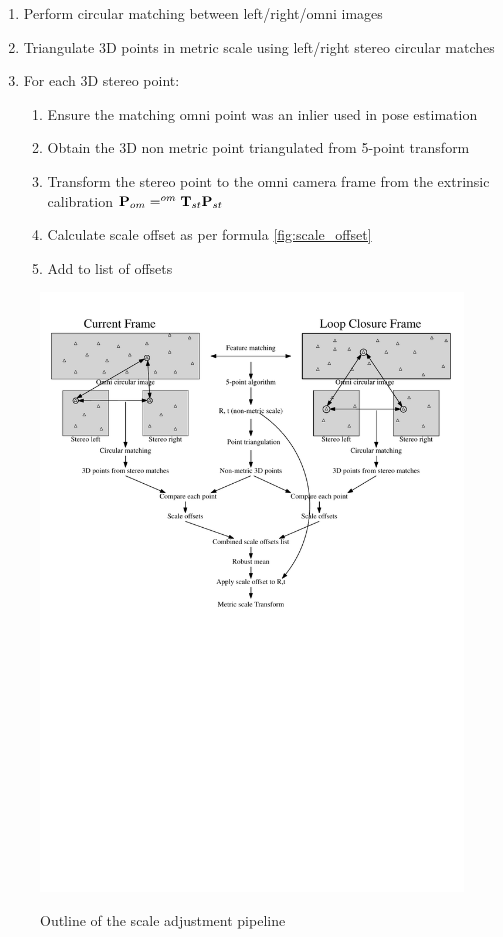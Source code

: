 \begin{enumerate}
\itemsep0em
 \item Perform circular matching between left/right/omni images %
 \item Triangulate 3D points in metric scale using left/right stereo circular matches
 \item For each 3D stereo point:
 \begin{enumerate}
   \item Ensure the matching omni point was an inlier used in pose estimation
   \item Obtain the 3D non metric point triangulated from 5-point transform
   \item Transform the stereo point to the omni camera frame from the extrinsic calibration $\mathbf P_{om} =  ^{om}\mathbf T_{st} \mathbf P_{st}$
   \item Calculate scale offset as per formula \ref{fig:scale_offset} %
   \item Add to list of offsets 
 \end{enumerate}
\end{enumerate} 

\begin{figure}[h]
  \centering
    \includegraphics[width=1.0\textwidth]{chapters/images/6_images_scale_adjust}\\
  \caption{Outline of the scale adjustment pipeline}
  \label{fig:scale_adjust_flowchart}
\end{figure}


